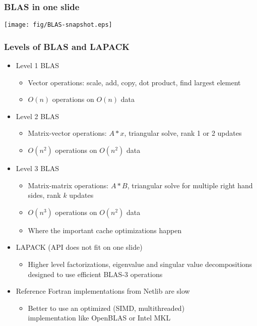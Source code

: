 \documentclass[compressed,dvips,letter]{beamer}
\begin{document}
%
%

\begin{frame}\frametitle{BLAS in one slide}

\texttt{[image: fig/BLAS-snapshot.eps]}

\end{frame}

%
%

\begin{frame}\frametitle{Levels of BLAS and LAPACK}
\begin{itemize}
\item Level 1 BLAS
\begin{itemize}
\item Vector operations: scale, add, copy, dot product, find largest element
\item $O(n)$ operations on $O(n)$ data
\end{itemize}
\item Level 2 BLAS
\begin{itemize}
\item Matrix-vector operations: $A * x$, triangular solve, rank 1 or 2 updates
\item $O(n^2)$ operations on $O(n^2)$ data
\end{itemize}
\item Level 3 BLAS
\begin{itemize}
\item Matrix-matrix operations: $A * B$, triangular solve for multiple right hand sides, rank $k$ updates
\item $O(n^3)$ operations on $O(n^2)$ data
\item Where the important cache optimizations happen
\end{itemize}
\item LAPACK (API does not fit on one slide)
\begin{itemize}
\item Higher level factorizations, eigenvalue and singular value decompositions designed to use efficient BLAS-3 operations
\end{itemize}
\item Reference Fortran implementations from Netlib are slow
\begin{itemize}
\item Better to use an optimized (SIMD, multithreaded) \\
implementation like OpenBLAS or Intel MKL
\end{itemize}
\end{itemize}
\end{frame}
\end{document}

